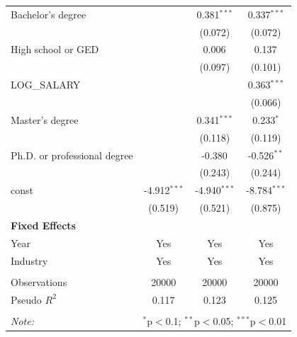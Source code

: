 \begin{table}[!htbp]
\begin{tabular}{@{\extracolsep{5pt}}lccc}
 Bachelor's degree & & 0.381$^{***}$ & 0.337$^{***}$ \\
& & (0.072) & (0.072) \\
 High school or GED & & 0.006$^{}$ & 0.137$^{}$ \\
& & (0.097) & (0.101) \\
 LOG_SALARY & & & 0.363$^{***}$ \\
& & & (0.066) \\
 Master's degree & & 0.341$^{***}$ & 0.233$^{*}$ \\
& & (0.118) & (0.119) \\
 Ph.D. or professional degree & & -0.380$^{}$ & -0.526$^{**}$ \\
& & (0.243) & (0.244) \\
 const & -4.912$^{***}$ & -4.940$^{***}$ & -8.784$^{***}$ \\
& (0.519) & (0.521) & (0.875) \\
 \textbf{Fixed Effects} &  &  &  \\
 Year & Yes & Yes & Yes \\
 Industry & Yes & Yes & Yes \\
\hline \\[-1.8ex]
 Observations & 20000 & 20000 & 20000 \\
 Pseudo $R^2$ & 0.117 & 0.123 & 0.125 \\
\hline
\hline \\[-1.8ex]
\textit{Note:} & \multicolumn{3}{r}{$^{*}$p$<$0.1; $^{**}$p$<$0.05; $^{***}$p$<$0.01} \\
\end{tabular}
\end{table}